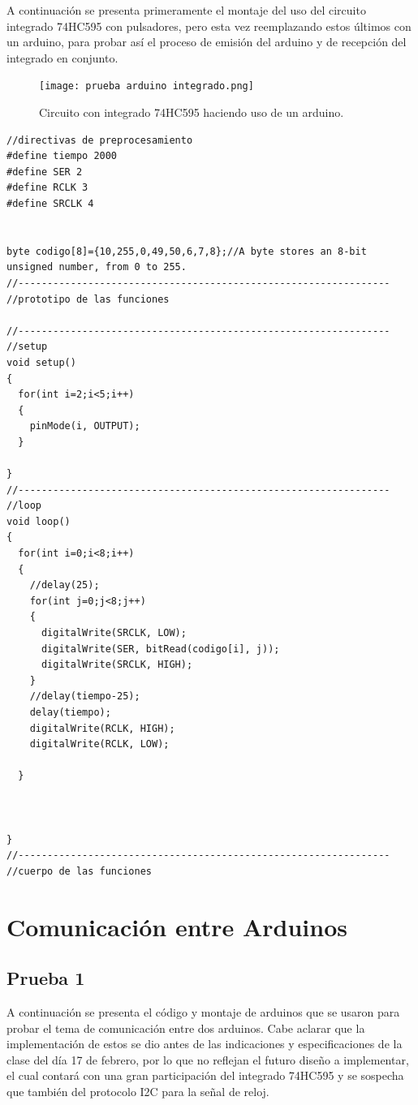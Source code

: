 \documentclass{article}
\begin{document}
\begin{itemize}
 A continuación se presenta primeramente el montaje del uso del circuito integrado 74HC595 con pulsadores, pero esta vez reemplazando estos últimos con un arduino, para probar así el proceso de emisión del arduino y de recepción del integrado en conjunto.

\begin{figure}[h]
\texttt{[image: prueba arduino integrado.png]}
\centering
\caption{Circuito con integrado 74HC595 haciendo uso de un arduino.}
\label{fig:reemplazo pulsador por arduino}
\end{figure}


\begin{lstlisting}[style=myArduino]
//directivas de preprocesamiento
#define tiempo 2000
#define SER 2
#define RCLK 3
#define SRCLK 4


byte codigo[8]={10,255,0,49,50,6,7,8};//A byte stores an 8-bit unsigned number, from 0 to 255.
//----------------------------------------------------------------
//prototipo de las funciones

//----------------------------------------------------------------
//setup
void setup()
{
  for(int i=2;i<5;i++)
  {
    pinMode(i, OUTPUT);
  }
  
}
//----------------------------------------------------------------
//loop
void loop()
{
  for(int i=0;i<8;i++)
  {
  	//delay(25);
    for(int j=0;j<8;j++)
    {
      digitalWrite(SRCLK, LOW);
      digitalWrite(SER, bitRead(codigo[i], j));
      digitalWrite(SRCLK, HIGH);
    }
    //delay(tiempo-25);
    delay(tiempo);
    digitalWrite(RCLK, HIGH);
    digitalWrite(RCLK, LOW);
    
  }
  
  
  
}
//----------------------------------------------------------------
//cuerpo de las funciones
\end{lstlisting}


\end{itemize}


\vspace{0.5cm}
\noindent


\section{Comunicación entre Arduinos} \label{Comunicación entre Arduinos}
\subsection{Prueba 1}\label{intento1}
A continuación se presenta el código y montaje de arduinos que se usaron para probar el tema de comunicación entre dos arduinos. Cabe aclarar que la implementación de estos se dio antes de las indicaciones y especificaciones de la clase del día 17 de febrero, por lo que no reflejan el futuro diseño a implementar, el cual contará con una gran participación del integrado 74HC595 y se sospecha que también del protocolo I2C para la señal de reloj.
\end{document}
